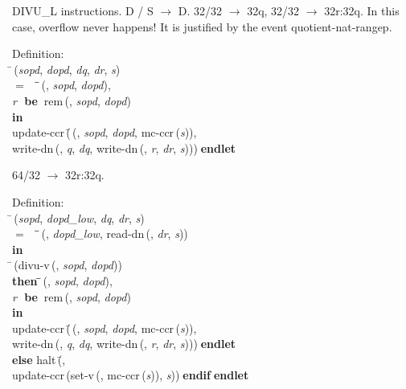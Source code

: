  DIVU\_L instructions.  D / S $\rightarrow$ D.
 32/32 $\rightarrow$ 32q,  32/32 $\rightarrow$ 32r:32q.  In this case, 
 overflow never happens!  It is justified by the event quotient-nat-rangep.
\begin{tabbing}{\sc Definition}: \\  
\=\,({\it{sopd\/}}, {\it{dopd\/}}, {\it{dq\/}}, {\it{dr\/}}, {\it{s\/}}) \\ 
$=$$\;\;\;\;$\=\=\,({}, {\it{sopd\/}}, {\it{dopd\/}}), \\ 
{\it{r\/}}{\bf $\;$ be$\;\;$}{\rm{rem}}\,({}, {\it{sopd\/}}, {\it{dopd\/}})\- \\ 
{\bf in} \\ 
{\rm{update-ccr}}\,(\=\,({}, {\it{sopd\/}}, {\it{dopd\/}}, {\rm{mc-ccr}}\,({\it{s\/}})), \\ 
{\rm{write-dn}}\,({}, {\it{q\/}}, {\it{dq\/}}, {\rm{write-dn}}\,({}, {\it{r\/}}, {\it{dr\/}}, {\it{s\/}})))\-$\;${\bf  endlet}\-\-
\end{tabbing}

 64/32 $\rightarrow$ 32r:32q.
\begin{tabbing}{\sc Definition}: \\  
\=\,({\it{sopd\/}}, {\it{dopd\_low\/}}, {\it{dq\/}}, {\it{dr\/}}, {\it{s\/}}) \\ 
$=$$\;\;\;\;$\=\=\,({}, {\it{dopd\_low\/}}, {\rm{read-dn}}\,({}, {\it{dr\/}}, {\it{s\/}}))\- \\ 
{\bf in} \\ 
\=\,({\rm{divu-v}}\,({}, {\it{sopd\/}}, {\it{dopd\/}})) \\ 
{\bf then }\=\=\,({}, {\it{sopd\/}}, {\it{dopd\/}}), \\ 
{\it{r\/}}{\bf $\;$ be$\;\;$}{\rm{rem}}\,({}, {\it{sopd\/}}, {\it{dopd\/}})\- \\ 
{\bf in} \\ 
{\rm{update-ccr}}\,(\=\,({}, {\it{sopd\/}}, {\it{dopd\/}}, {\rm{mc-ccr}}\,({\it{s\/}})), \\ 
{\rm{write-dn}}\,({}, {\it{q\/}}, {\it{dq\/}}, {\rm{write-dn}}\,({}, {\it{r\/}}, {\it{dr\/}}, {\it{s\/}})))\-$\;${\bf  endlet}\- \\ 
{\bf else }{\rm{halt}}\,(\=, \\ 
{\rm{update-ccr}}\,({\rm{set-v}}\,({}, {\rm{mc-ccr}}\,({\it{s\/}})), {\it{s\/}}))\-$\;${\bf  endif}\-$\;${\bf  endlet}\-\-
\end{tabbing}

